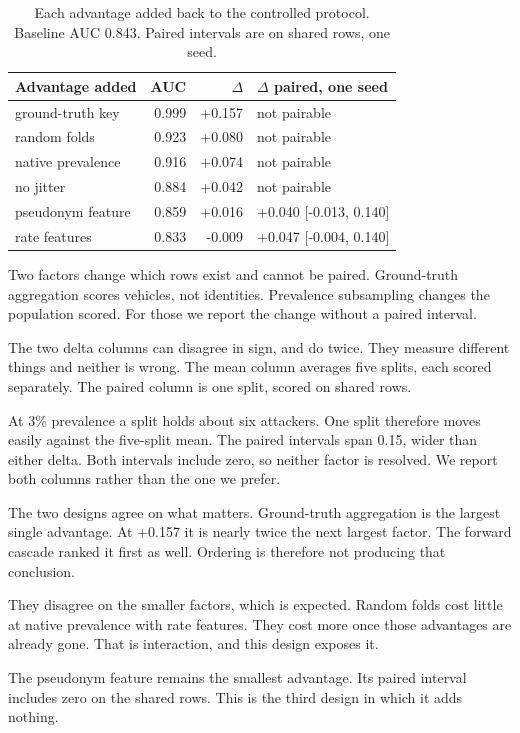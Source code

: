 \documentclass[journal,twoside]{IEEEtran}
\begin{document}
\begin{table}[t]
\caption{Each advantage added back to the controlled protocol.
Baseline AUC 0.843. Paired intervals are on shared rows, one seed.}
\label{tab:single}
\centering
\footnotesize
\begin{tabular}{@{}lrrl@{}}
\toprule
Advantage added & AUC & $\Delta$ & $\Delta$ paired, one seed \\
\midrule
ground-truth key & 0.999 & +0.157 & not pairable \\
random folds & 0.923 & +0.080 & not pairable \\
native prevalence & 0.916 & +0.074 & not pairable \\
no jitter & 0.884 & +0.042 & not pairable \\
pseudonym feature & 0.859 & +0.016 & +0.040 [-0.013, 0.140] \\
rate features & 0.833 & -0.009 & +0.047 [-0.004, 0.140] \\
\bottomrule
\end{tabular}
\end{table}

Two factors change which rows exist and cannot be paired.
Ground-truth aggregation scores vehicles, not identities.
Prevalence subsampling changes the population scored.
For those we report the change without a paired interval.

The two delta columns can disagree in sign, and do twice.
They measure different things and neither is wrong.
The mean column averages five splits, each scored separately.
The paired column is one split, scored on shared rows.

At 3\% prevalence a split holds about six attackers.
One split therefore moves easily against the five-split mean.
The paired intervals span 0.15, wider than either delta.
Both intervals include zero, so neither factor is resolved.
We report both columns rather than the one we prefer.

The two designs agree on what matters.
Ground-truth aggregation is the largest single advantage.
At +0.157 it is nearly twice the next largest factor.
The forward cascade ranked it first as well.
Ordering is therefore not producing that conclusion.

They disagree on the smaller factors, which is expected.
Random folds cost little at native prevalence with rate features.
They cost more once those advantages are already gone.
That is interaction, and this design exposes it.

The pseudonym feature remains the smallest advantage.
Its paired interval includes zero on the shared rows.
This is the third design in which it adds nothing.
\end{document}
